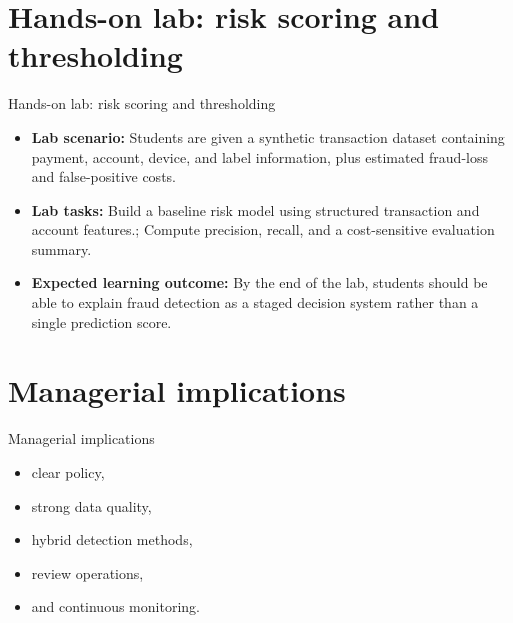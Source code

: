 \documentclass[aspectratio=169]{beamer}
\begin{document}
\section{Hands-on lab: risk scoring and thresholding}

\begin{frame}{Hands-on lab: risk scoring and thresholding}
  \begin{itemize}
    \item \textbf{Lab scenario:} Students are given a synthetic transaction dataset containing payment, account, device, and label information, plus estimated fraud-loss and false-positive costs.
    \item \textbf{Lab tasks:} Build a baseline risk model using structured transaction and account features.; Compute precision, recall, and a cost-sensitive evaluation summary.
    \item \textbf{Expected learning outcome:} By the end of the lab, students should be able to explain fraud detection as a staged decision system rather than a single prediction score.
  \end{itemize}
\end{frame}

\section{Managerial implications}

\begin{frame}{Managerial implications}
  \begin{itemize}
    \item clear policy,
    \item strong data quality,
    \item hybrid detection methods,
    \item review operations,
    \item and continuous monitoring.
  \end{itemize}
\end{frame}
\end{document}
